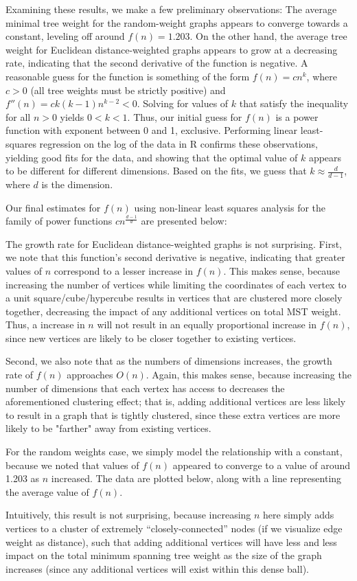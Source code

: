 \documentclass[a4paper]{article}
\begin{document}
Examining these results, we make a few preliminary observations: The average minimal tree weight for the random-weight graphs appears to converge towards a constant, leveling off around $f(n) = 1.203$. On the other hand, the average tree weight for Euclidean distance-weighted graphs appears to grow at a decreasing rate, indicating that the second derivative of the function is negative. A reasonable guess for the function is something of the form $f(n) = cn^k$, where $c>0$ (all tree weights must be strictly positive) and $f''(n) = ck(k-1)n^{k-2} < 0$. Solving for values of $k$ that satisfy the inequality for all $n>0$ yields $0<k<1$. Thus, our initial guess for $f(n)$ is a power function with exponent between 0 and 1, exclusive. Performing linear least-squares regression on the log of the data in R confirms these observations, yielding good fits for the data, and showing that the optimal value of $k$ appears to be different for different dimensions. Based on the fits, we guess that $k\approx \frac{d}{d-1}$, where $d$ is the dimension.

Our final estimates for $f(n)$ using non-linear least squares analysis for the family of power functions $cn^{\frac{d-1}{d}}$ are presented below:


The growth rate for Euclidean distance-weighted graphs is not surprising. First, we note that this function's second derivative is negative, indicating that greater values of $n$ correspond to a lesser increase in $f(n)$. This makes sense, because increasing the number of vertices while limiting the coordinates of each vertex to a unit square/cube/hypercube results in vertices that are clustered more closely together, decreasing the impact of any additional vertices on total MST weight. Thus, a increase in $n$ will not result in an equally proportional increase in $f(n)$, since new vertices are likely to be closer together to existing vertices.

Second, we also note that as the numbers of dimensions increases, the growth rate of $f(n)$ approaches $O(n)$. Again, this makes sense, because increasing the number of dimensions that each vertex has access to decreases the aforementioned clustering effect; that is, adding additional vertices are less likely to result in a graph that is tightly clustered, since these extra vertices are more likely to be "farther" away from existing vertices.

For the random weights case, we simply model the relationship with a constant, because we noted that values of $f(n)$ appeared to converge to a value of around 1.203 as $n$ increased. The data are plotted below, along with a line representing the average value of $f(n)$.


Intuitively, this result is not surprising, because increasing $n$ here simply adds vertices to a cluster of extremely ``closely-connected'' nodes (if we visualize edge weight as distance), such that adding additional vertices will have less and less impact on the total minimum spanning tree weight as the size of the graph increases (since any additional vertices will exist within this dense ball).
\end{document}
